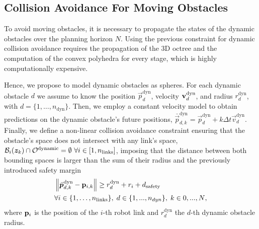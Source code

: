\subsection{Collision Avoidance For Moving Obstacles}%
\label{sub:collision_avoidance_dynamic}
%
To avoid moving obstacles, it is necessary to propagate the states of the dynamic obstacles over the planning horizon $N$. Using the previous constraint for dynamic collision avoidance requires the propagation of the 3D octree and the computation of the convex polyhedra for every stage, which is highly computationally expensive. 

Hence, we propose to model dynamic obstacles as spheres. For each dynamic obstacle $d$ we assume to know the position 
$\vec{p}^{\textrm{dyn}}_{d}$, velocity $\mathbf{v}_{d}^{\textrm{dyn}}$, and radius $r_d^{\textrm{dyn}}$, with $d=\{1,\dots,n_{\textrm{dyn}}\}$. Then, we employ a constant velocity model to obtain predictions on the dynamic obstacle's future positions, $\bar{\vec{p}}^{\textrm{dyn}}_{d,k} = \vec{p}_{d}^{\textrm{dyn}} + k\Delta t\vec{v}_{d}^{\textrm{dyn}}$.
Finally, we define a non-linear collision avoidance constraint ensuring that the obstacle's space does not intersect with any link's space, %
$\mathcal{B}_i(\bm{z}_k) \cap\mathcal{O}^{\textrm{dynamic}}=\emptyset \,\, \forall i \in [1,n_{\textrm{links}}]$, imposing that the distance between both bounding spaces is larger than the sum of their radius and the previously introduced safety margin
\begin{equation}
  \begin{split}
  &\left\lVert\bar{\bm{p}}_{d,k}^{\textrm{dyn}} - \mathbf{p}_{i,k}\right\rVert  
    \geq r_d^{\textrm{dyn}} + r_i + d_{\textrm{safety}}  \\ &\forall i \in\{1,\dots,n_{\textrm{links}}\},\; d\in\{1,...,n_{dyn}\},\;k\in{0,...,N},
  \end{split}
\end{equation}
where $\mathbf{p}_{i}$ is the position of the $i$-th robot link and $r_d^{\textrm{dyn}}$ the $d$-th dynamic obstacle radius.


